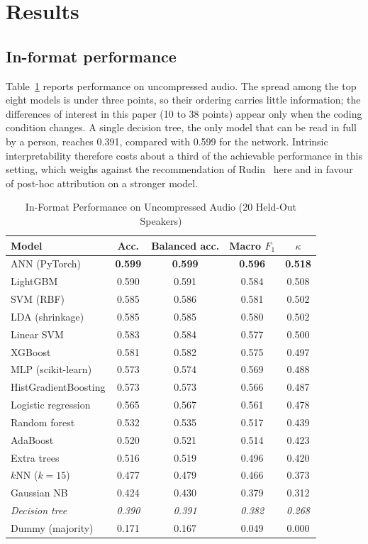 \documentclass[lettersize,journal]{IEEEtran}
\begin{document}
\section{Results}

\subsection{In-format performance}\label{sec:leaderboard}
Table~\ref{tab:leaderboard} reports performance on uncompressed audio. The
spread among the top eight models is under three points, so their ordering
carries little information; the differences of interest in this paper (10 to 38
points) appear only when the coding condition changes. A single decision tree,
the only model that can be read in full by a person, reaches 0.391, compared
with 0.599 for the network. Intrinsic interpretability therefore costs about a
third of the achievable performance in this setting, which weighs against the
recommendation of Rudin~\cite{rudin2019stop} here and in favour of post-hoc
attribution on a stronger model.

\begin{table}[!t]
\caption{In-Format Performance on Uncompressed Audio (20 Held-Out Speakers)}
\label{tab:leaderboard}
\centering
\footnotesize
\setlength{\tabcolsep}{5pt}
\begin{tabular}{@{}lcccc@{}}
\toprule
Model & Acc. & Balanced acc. & Macro $F_1$ & $\kappa$\\
\midrule
ANN (PyTorch)          & \textbf{0.599} & \textbf{0.599} & \textbf{0.596} & \textbf{0.518}\\
LightGBM               & 0.590 & 0.591 & 0.584 & 0.508\\
SVM (RBF)              & 0.585 & 0.586 & 0.581 & 0.502\\
LDA (shrinkage)        & 0.585 & 0.585 & 0.580 & 0.502\\
Linear SVM             & 0.583 & 0.584 & 0.577 & 0.500\\
XGBoost                & 0.581 & 0.582 & 0.575 & 0.497\\
MLP (scikit-learn)     & 0.573 & 0.574 & 0.569 & 0.488\\
HistGradientBoosting   & 0.573 & 0.573 & 0.566 & 0.487\\
Logistic regression    & 0.565 & 0.567 & 0.561 & 0.478\\
Random forest          & 0.532 & 0.535 & 0.517 & 0.439\\
AdaBoost               & 0.520 & 0.521 & 0.514 & 0.423\\
Extra trees            & 0.516 & 0.519 & 0.496 & 0.420\\
$k$NN ($k=15$)         & 0.477 & 0.479 & 0.466 & 0.373\\
Gaussian NB            & 0.424 & 0.430 & 0.379 & 0.312\\
\textit{Decision tree} & \textit{0.390} & \textit{0.391} & \textit{0.382} & \textit{0.268}\\
Dummy (majority)       & 0.171 & 0.167 & 0.049 & 0.000\\
\bottomrule
\end{tabular}
\end{table}
\end{document}
